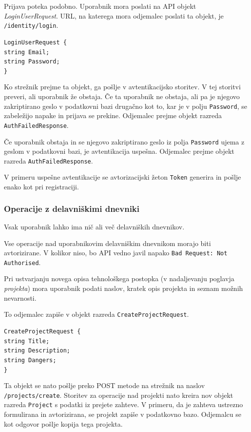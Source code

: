 \documentclass[a4paper, 12pt]{book}
\begin{document}
Prijava poteka podobno.
Uporabnik mora poslati na API objekt \textit{LoginUserRequest}.
URL, na katerega mora odjemalec poslati ta objekt, je \texttt{/identity/login}.

\noindent
\texttt{LoginUserRequest \{ \\
  string Email; \\
  string Password; \\
\} }

Ko strežnik prejme ta objekt, ga pošlje v avtentikacijsko storitev.
V tej storitvi preveri, ali uporabnik že obstaja.
Če ta uporabnik ne obstaja, ali pa je njegovo zakriptirano geslo v podatkovni bazi drugačno kot to, kar je v polju \texttt{Password}, se zabeležijo napake in prijava se prekine.
Odjemalec prejme objekt razreda \texttt{AuthFailedResponse}.

Če uporabnik obstaja in se njegovo zakriptirano geslo iz polja \texttt{Password} ujema z geslom v podatkovni bazi, je avtentikacija uspešna.
Odjemalec prejme objekt razreda \texttt{AuthFailedResponse}.

V primeru uspešne avtentikacije se avtorizacijski žeton \texttt{Token} generira in pošlje enako kot pri registraciji.

\subsubsection{Operacije z delavniškimi dnevniki}

Vsak uporabnik lahko ima nič ali več delavniških dnevnikov.

Vse operacije nad uporabnikovim delavniškim dnevnikom morajo biti avtorizirane.
V kolikor niso, bo API vedno javil napako \texttt{Bad Request: Not Authorised}.

Pri ustvarjanju novega opisa tehnološkega postopka (v nadaljevanju poglavja \textit{projekta}) mora uporabnik podati naslov, kratek opis projekta in seznam možnih nevarnosti.

To odjemalec zapiše v objekt razreda \texttt{CreateProjectRequest}.

\noindent \texttt{CreateProjectRequest \{ \\
string Title; \\ 
string Description; \\
string Dangers; \\
\} }

\noindent Ta objekt se nato pošlje preko POST metode na strežnik na naslov \texttt{/projects/create}.
Storitev za operacije nad projekti nato kreira nov objekt razreda \texttt{Project} s podatki iz prejete zahteve.
V primeru, da je zahteva ustrezno formulirana in avtorizirana, se projekt zapiše v podatkovno bazo.
Odjemalcu se kot odgovor pošlje kopija tega projekta.
\end{document}
